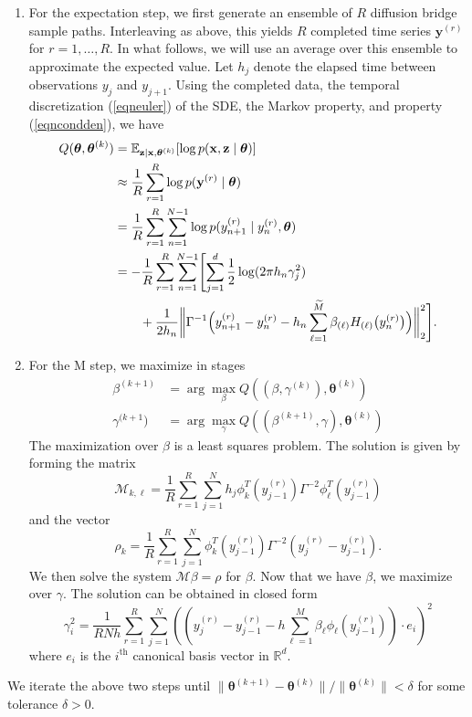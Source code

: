 \documentclass{article}
\newcommand{\btheta}{\ensuremath{\bm{\theta}}}
\newcommand{\bx}{\ensuremath{\mathbf{x}}}
\newcommand{\by}{\ensuremath{\mathbf{y}}}
\newcommand{\bz}{\ensuremath{\mathbf{z}}}
\begin{document}
\begin{enumerate}
\item For the expectation step, we first generate an ensemble of $R$ diffusion bridge sample paths.  Interleaving as above, this yields $R$ completed time series $\by^{(r)}$ for $r = 1, \ldots, R$.  In what follows, we will use an average over this ensemble to approximate the expected value.  Let $h_j$ denote the elapsed time between observations $y_j$ and $y_{j+1}$.  Using the completed data, the temporal discretization (\ref{eqneuler}) of the SDE, the Markov property, and property (\ref{eqncondden}), we have
\begin{align}
\label{eqnqfun}
Q(\btheta, \btheta^{(k)}) &= \mathbb{E}_{\bz \mid \bx, \btheta^{(k)}} [\log p(\bx, \bz \mid \btheta)] \\
 &\approx \frac{1}{R} \sum_{r=1}^R \log p(\by^{(r)} \mid \btheta) \nonumber \\
 &= \frac{1}{R} \sum_{r=1}^R \sum_{n=1}^{N-1} \log p(y_{n+1}^{(r)} \mid y_n^{(r)}, \btheta) \nonumber \\
 &= -\frac{1}{R} \sum_{r=1}^R \sum_{n=1}^{N-1} \Biggl[ \sum_{j=1}^d \frac{1}{2} \log(2 \pi h_n \gamma_j^2) \nonumber \\
 &\qquad + \frac{1}{2h_n} \biggl\| \Gamma^{-1} \Bigl(y_{n+1}^{(r)} - y_n^{(r)} - h_n \sum_{\ell=1}^{\widetilde{M}} \beta_{(\ell)} H_{(\ell)}\bigl(y_n^{(r)}\bigr)\Bigr) \biggr\|_2^2 \Biggr].
\end{align}
\item For the M step, we maximize in stages
\begin{align*}
\beta^{(k+1)} &= \arg \max_{\beta} Q( (\beta, \gamma^{(k)}), \btheta^{(k)}) \\
\gamma^{(k+1}) &= \arg \max_{\gamma} Q( (\beta^{(k+1)}, \gamma), \btheta^{(k)})
\end{align*}
The maximization over $\beta$ is a least squares problem.  The solution is given by forming the matrix
\begin{equation}
\label{eqnestM}
\mathcal{M}_{k,\ell} = \frac{1}{R} \sum_{r=1}^{R} \sum_{j=1}^N h_j \phi_k^T (y_{j-1}^{(r)}) \Gamma^{-2} \phi_\ell^T (y_{j-1}^{(r)})
\end{equation}
and the vector
\begin{equation}
\label{eqnestrho}
\rho_k = \frac{1}{R} \sum_{r=1}^{R} \sum_{j=1}^N \phi_k^T (y_{j-1}^{(r)}) \Gamma^{-2} (y_j^{(r)} - y_{j-1}^{(r)}).
\end{equation}
We then solve the system $\mathcal{M} \beta = \rho$ for $\beta$.  Now that we have $\beta$, we maximize over $\gamma$.  The solution can be obtained in closed form
\begin{equation}
\label{eqnestgamma}
\gamma_i^2 = \frac{1}{R N h} \sum_{r=1}^{R} \sum_{j=1}^N (( y_j^{(r)} - y_{j-1}^{(r)} - h \sum_{\ell=1}^M \beta_\ell \phi_\ell (y_{j-1}^{(r)}) ) \cdot e_i )^2
\end{equation}
where $e_i$ is the $i^\text{th}$ canonical basis vector in $\mathbb{R}^d$.
\end{enumerate}
We iterate the above two steps until $\| \btheta^{(k+1)} - \btheta^{(k)} \|/\| \btheta^{(k)} \| < \delta$ for some tolerance $\delta > 0$.
\end{document}
